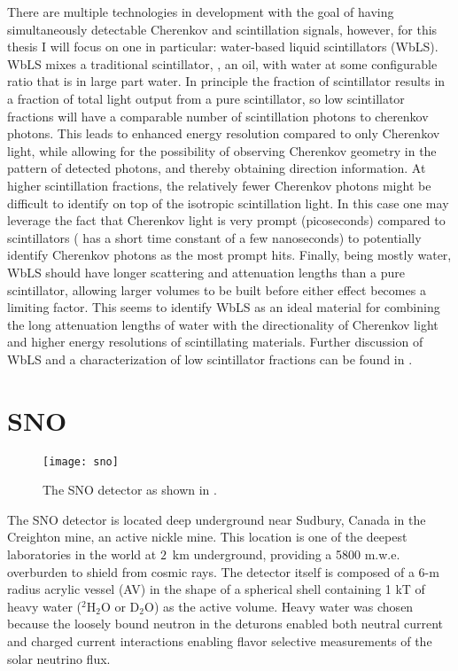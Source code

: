There are multiple technologies in development with the goal of having simultaneously detectable Cherenkov and scintillation signals, however, for this thesis I will focus on one in particular: water-based liquid scintillators (WbLS).
WbLS mixes a traditional scintillator, {\labppo}, an oil, with water at some configurable ratio that is in large part water.
In principle the fraction of scintillator results in a fraction of total light output from a pure scintillator, so low scintillator fractions will have a comparable number of scintillation photons to cherenkov photons. 
This leads to enhanced energy resolution compared to only Cherenkov light, while allowing for the possibility of observing Cherenkov geometry in the pattern of detected photons, and thereby obtaining direction information.
At higher scintillation fractions, the relatively fewer Cherenkov photons might be difficult to identify on top of the isotropic scintillation light.
In this case one may leverage the fact that Cherenkov light is very prompt (picoseconds) compared to scintillators ({\labppo} has a short time constant of a few nanoseconds) to potentially identify Cherenkov photons as the most prompt hits.
Finally, being mostly water, WbLS should have longer scattering and attenuation lengths than a pure scintillator, allowing larger volumes to be built before either effect becomes a limiting factor.
This seems to identify WbLS as an ideal material for combining the long attenuation lengths of water with the directionality of Cherenkov light and higher energy resolutions of scintillating materials.
Further discussion of WbLS and a characterization of low scintillator fractions can be found in .

\section{SNO}

\begin{figure}
\centering
    \texttt{[image: sno]}
    \caption{\label{fig:sno}The SNO detector as shown in \cite{3phase}.}
\end{figure}

The SNO \cite{sno} detector is located deep underground near Sudbury, Canada in the Creighton mine, an active nickle mine.
This location is one of the deepest laboratories in the world at $2$~km underground, providing a 5800 m.w.e. overburden to shield from cosmic rays.
The detector itself is composed of a 6-m radius acrylic vessel (AV) in the shape of a spherical shell containing 1 kT of heavy water ($^2$H$_2$O or D$_2$O) as the active volume.
Heavy water was chosen because the loosely bound neutron in the deturons enabled both neutral current and charged current interactions enabling flavor selective measurements of the solar neutrino flux.

